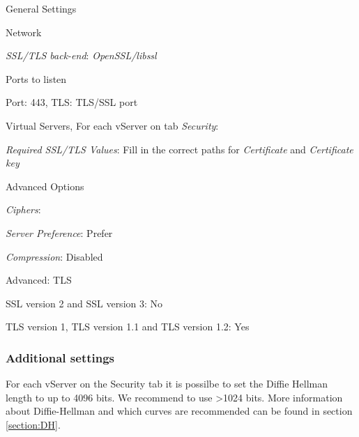 \begin{itemize*}
    \item General Settings
    \begin{itemize*}
        \item Network
        \begin{itemize*}
            \item \emph{SSL/TLS back-end}: \emph{OpenSSL/libssl}
        \end{itemize*}
        \item Ports to listen
        \begin{itemize*}
            \item Port: 443, TLS: TLS/SSL port
        \end{itemize*}
    \end{itemize*}
    \item Virtual Servers, For each vServer on tab \emph{Security}:
    \begin{itemize*}
        \item \emph{Required SSL/TLS Values}: Fill in the correct paths for \emph{Certificate} and \emph{Certificate key}
        \item Advanced Options
        \begin{itemize*}
            \item \emph{Ciphers}: \ttbox{\cipherStringB}
            \item \emph{Server Preference}: Prefer
            \item \emph{Compression}: Disabled
        \end{itemize*}
    \end{itemize*}
    \item Advanced: TLS
    \begin{itemize*}
        \item SSL version 2 and SSL version 3: No
        \item TLS version 1, TLS version 1.1 and TLS version 1.2: Yes
    \end{itemize*}
\end{itemize*}

\subsubsection{Additional settings}
For each vServer on the Security tab it is possilbe to set the Diffie Hellman length to up to 4096 bits. We recommend to use \textgreater 1024 bits.
More information about Diffie-Hellman and which curves are recommended can be found in section \ref{section:DH}.

